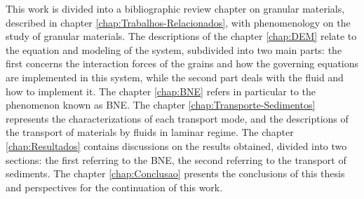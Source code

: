 
    This work is divided into a bibliographic review chapter on granular materials, described in chapter \ref{chap:Trabalhos-Relacionados}, with phenomenology on the study of granular materials. The descriptions of the chapter \ref{chap:DEM} relate to the equation and modeling of the system, subdivided into two main parts: the first concerns the interaction forces of the grains and how the governing equations are implemented in this system, while the second part deals with the fluid and how to implement it. The chapter \ref{chap:BNE} refers in particular to the phenomenon known as BNE. The chapter \ref{chap:Transporte-Sedimentos} represents the characterizations of each transport mode, and the descriptions of the transport of materials by fluids in laminar regime. The chapter \ref{chap:Resultados} contains discussions on the results obtained, divided into two sections: the first referring to the BNE, the second referring to the transport of sediments. The chapter \ref{chap:Conclusao} presents the conclusions of this thesis and perspectives for the continuation of this work.
